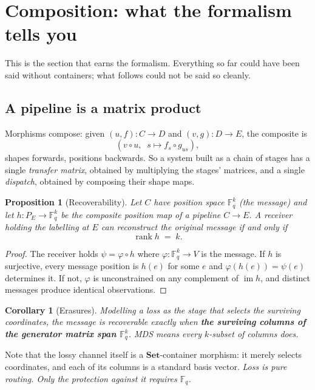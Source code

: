 \documentclass[11pt,a4paper]{article}
\newtheorem{proposition}[theorem]{Proposition}
\newtheorem{corollary}[theorem]{Corollary}
\theoremstyle{definition}
\theoremstyle{remark}
\newcommand{\FF}{\mathbb{F}}
\newcommand{\cat}[1]{\mathbf{#1}}
\newcommand{\Set}{\cat{Set}}
\DeclareMathOperator{\rank}{rank}
\DeclareMathOperator{\im}{im}
\begin{document}
\section{Composition: what the formalism tells you}\label{sec:composition}

This is the section that earns the formalism. Everything so far could have been said
without containers; what follows could not be said so cleanly.

\subsection{A pipeline is a matrix product}

Morphisms compose: given $(u,f) : C \to D$ and $(v,g) : D \to E$, the composite is
\[
  (v \circ u,\;\; s \mapsto f_s \circ g_{u s}),
\]
shapes forwards, positions backwards. So a system built as a chain of stages has a
single \emph{transfer matrix}, obtained by multiplying the stages' matrices, and a
single \emph{dispatch}, obtained by composing their shape maps.

\begin{proposition}[Recoverability]\label{prop:recover}
Let $C$ have position space $\FF_q^{k}$ (the message) and let $h : P_E \to \FF_q^{k}$
be the composite position map of a pipeline $C \to E$. A receiver holding the
labelling at $E$ can reconstruct the original message if and only if
\[
  \rank h \;=\; k .
\]
\end{proposition}

\begin{proof}
The receiver holds $\psi = \varphi \circ h$ where $\varphi : \FF_q^{k} \to V$ is the
message. If $h$ is surjective, every message position is $h(e)$ for some $e$ and
$\varphi(h(e)) = \psi(e)$ determines it. If not, $\varphi$ is unconstrained on any
complement of $\im h$, and distinct messages produce identical observations.
\end{proof}

\begin{corollary}[Erasures]
Modelling a loss as the stage that selects the surviving coordinates, the message is
recoverable exactly when \textbf{the surviving columns of the generator matrix span
$\FF_q^{k}$}. MDS means every $k$-subset of columns does.
\end{corollary}

Note that the lossy channel itself is a $\Set$-container morphism: it merely selects
coordinates, and each of its columns is a standard basis vector. \emph{Loss is pure
routing. Only the protection against it requires $\FF_q$.}
\end{document}
